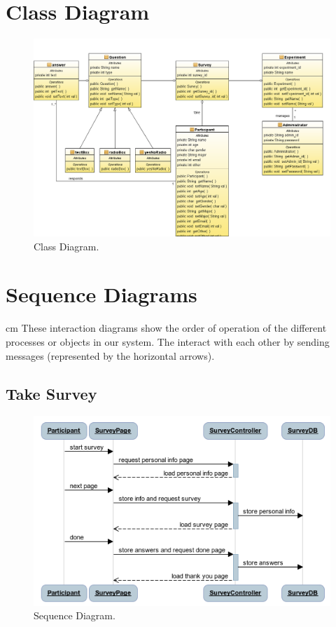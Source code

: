 \documentclass[a4paper,12pt,oneside]{report}
\begin{document}
\section{Class Diagram}
\vskip 2cm
\begin{figure}[h!]
  \begin{center}
   \includegraphics[width=16.2cm]{pics/class.png}
  \end{center}
\caption{Class Diagram.}
\end{figure}

\newpage

\section{Sequence Diagrams}
 cm
These interaction diagrams show the order of operation of the different processes or objects in our system. The interact with each other by sending messages (represented by the horizontal arrows).
\vskip 1cm
\subsection{Take Survey}
\vskip 1cm
\begin{figure}[!hp]
  \begin{center}
   \includegraphics[width=11.5cm]{pics/take_survey.png}
  \end{center}
\caption{Sequence Diagram.}
\end{figure}
\newpage
\end{document}
